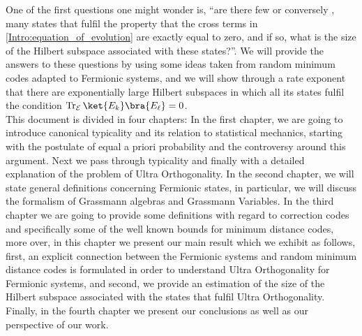 \indent One of the first questions one might wonder is, ``are there few or conversely , many states that fulfil the property that the cross terms in \eqref{Intro:equation_of_evolution} are exactly equal to zero, and if so, what is the size of the Hilbert subspace associated with these states?''. We will provide the answers to these questions by using some ideas taken from random minimum codes adapted to Fermionic systems, and we will show through a rate exponent that there are exponentially large Hilbert subspaces in which all its states fulfil the condition $\operatorname{Tr}_{\mathcal{E}}\ket{E_k}\bra{E_\ell} = 0$.\\

\indent This document is divided in four chapters: In the first chapter, we are going to introduce canonical typicality and its relation to statistical mechanics, starting with the postulate of equal a priori probability and the controversy around this argument. Next we pass through typicality and finally with a detailed explanation of the problem of Ultra Orthogonality. In the second chapter, we will state general definitions concerning Fermionic states, in particular, we will discuss the formalism of Grassmann algebras and Grassmann Variables. In the third chapter we are going to provide some definitions with regard to correction codes and specifically some of the well known bounds for minimum distance codes, more over, in this chapter we present our main result which we exhibit as follows, first, an explicit connection between the Fermionic systems and random minimum distance codes is formulated in order to understand Ultra Orthogonality for Fermionic systems, and second, we provide an estimation of the size of the Hilbert subspace associated with the states that fulfil Ultra Orthogonality. Finally, in the fourth chapter we present our conclusions as well as our perspective of our work.


